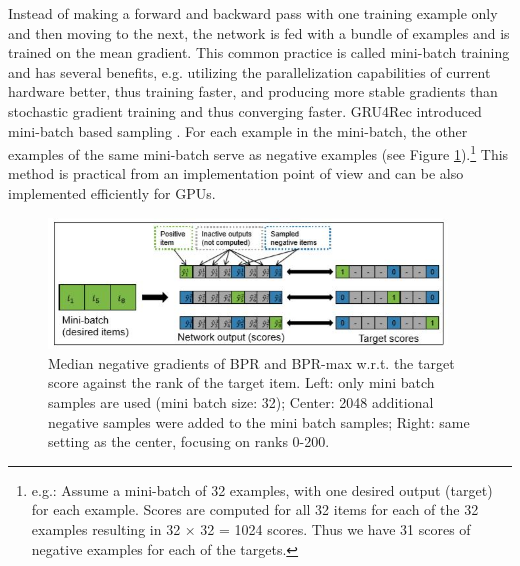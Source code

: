 Instead of making a forward and backward pass with one training example only and then moving
to the next, the network is fed with a bundle of examples and is trained on the mean gradient. This
common practice is called mini-batch training and has several benefits, e.g. utilizing the parallelization capabilities of current hardware better, thus training faster, and producing more stable gradients
than stochastic gradient training and thus converging faster. GRU4Rec introduced mini-batch based
sampling \cite{hidasi2015session}. For each example in the mini-batch, the other examples of the same
mini-batch serve as negative examples (see Figure \ref{fig:p1}).\footnote[3]{
e.g.: Assume a mini-batch of 32 examples, with one desired output (target) for each example. Scores are
computed for all 32 items for each of the 32 examples resulting in 32 × 32 = 1024 scores. Thus we have 31
scores of negative examples for each of the targets.} 
This method is practical from an implementation point of view and can be also implemented efficiently for GPUs.

\graphicspath{{img/}}

\begin{figure}[htp]
    \centering
    \includegraphics[width=400]{img/p1.JPG}
    \caption{Median negative gradients of BPR and BPR-max w.r.t. the target score against the rank of the target item. Left: only mini batch samples are used (mini batch size: 32); Center: 2048 additional negative samples were added to the mini batch samples; Right: same setting as the center, focusing on ranks 0-200.}
    \label{fig:p1}
\end{figure}


